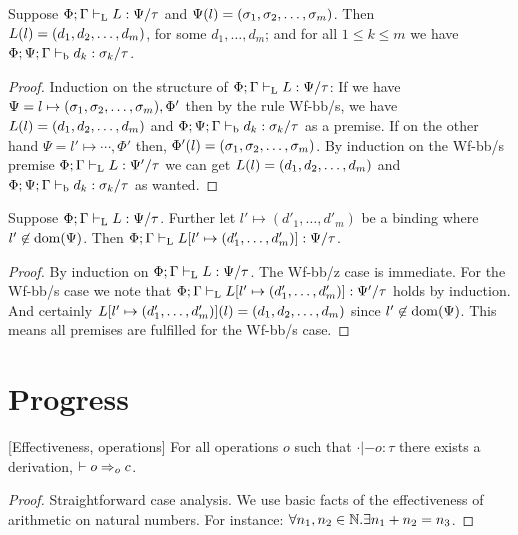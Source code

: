 \documentclass[a4paper, oneside, 10pt, final]{memoir}
\begin{document}
\begin{lem}
  \label{lem:tpbb-lookup}
  Suppose $\Phi;\Gamma |-_{\mathrm{L}} L : \Psi / \tau$ and $\Psi(l) =
  (\sigma_1, \sigma_2, \dotsc, \sigma_m)$. Then $L(l) = (d_1, d_2, \dotsc, d_m)$, for some $d_1, \dotsc, d_m$; and
  for all $1 \leq k \leq m$ we have $\Phi;\Psi;\Gamma
  |-_{\mathrm{b}} d_k : \sigma_k / \tau$.
\end{lem}
\begin{proof}
  Induction on the structure of $\Phi;\Gamma |-_{\mathrm{L}} L : \Psi / \tau$:
  If we have $\Psi = l \mapsto (\sigma_1, \sigma_2, \dotsc, \sigma_m), \Phi'$ then by the rule Wf-bb/s, we
  have $L(l) = (d_1, d_2, \dotsc, d_m)$ and $\Phi;\Psi;\Gamma |-_{\mathrm{b}} d_k : \sigma_k /
  \tau$ as a premise. If on the other hand $\Psi = l'
  \mapsto \dotsb, \Phi'$ then, $\Phi'(l) = (\sigma_1, \sigma_2, \dotsc, \sigma_m)$. By induction on
  the Wf-bb/s premise $\Phi;\Gamma |-_{\mathrm{L}} L : \Psi' / \tau$ we can get $L(l) =
  (d_1, d_2, \dotsc, d_m)$ and $\Phi;\Psi;\Gamma |-_{\mathrm{b}} d_k : \sigma_k / \tau$ as wanted.
\end{proof}

\newcommand{\dbundlep}{(d'_1, \dotsc, d'_m)}
\begin{lem}
  \label{lem:tpbb-weaken-l}
  Suppose $\Phi;\Gamma |-_{\mathrm{L}} L : \Psi / \tau$. Further let $l' \mapsto
  \dbundlep$ be a binding where $l' \not \in \mathrm{dom}(\Psi)$. Then
  $\Phi;\Gamma \tpbb L[l' \mapsto \dbundlep] : \Psi / \tau$.
\end{lem}
\begin{proof}
  By induction on $\Phi;\Gamma |-_{\mathrm{L}} L : \Psi / \tau$. The Wf-bb/z
  case is immediate. For the Wf-bb/s case we note that $\Phi;\Gamma
  \tpbb L[l' \mapsto \dbundlep] : \Psi' / \tau$ holds by
  induction. And certainly $L[l' \mapsto \dbundlep](l) = \dbundle$
  since $l' \not \in \mathrm{dom}(\Psi)$. This means all premises are
  fulfilled for the Wf-bb/s case.
\end{proof}
\section{Progress}

\begin{lem}{[Effectiveness, operations]}
  \label{lem:can-step-op}
  For all operations $o$ such that $\cdot |- o : \tau$ there exists a
  derivation, $|- o =>_{o} c$.
\end{lem}
\begin{proof}
  Straightforward case analysis. We use basic facts of the
  effectiveness of arithmetic on natural numbers. For instance:
  $\forall n_1, n_2 \in \mathbb{N} . \exists n_1 + n_2 = n_3$.
\end{proof}
\end{document}
